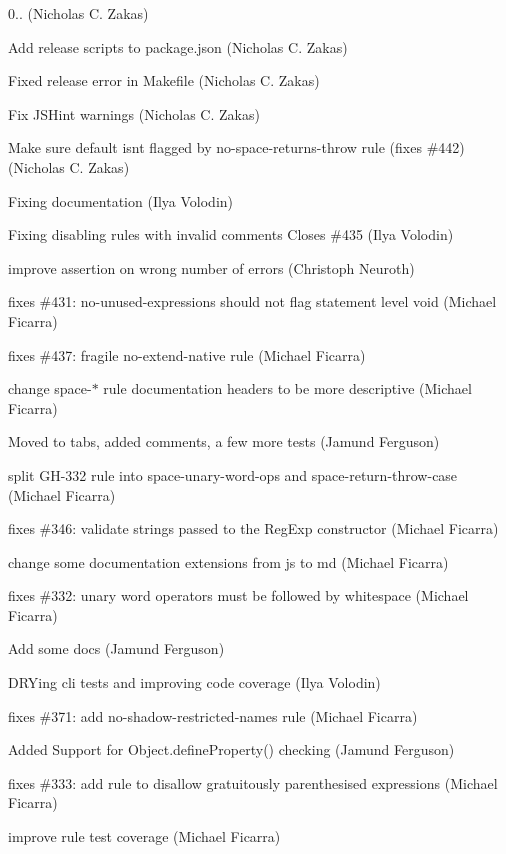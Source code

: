 \begin{DoxyItemize}
\item 0.. (Nicholas C. Zakas)
\item Add release scripts to package.\+json (Nicholas C. Zakas)
\item Fixed release error in Makefile (Nicholas C. Zakas)
\item Fix J\+S\+Hint warnings (Nicholas C. Zakas)
\item Make sure \textquotesingle{}default\textquotesingle{} isn\textquotesingle{}t flagged by no-\/space-\/returns-\/throw rule (fixes \#442) (Nicholas C. Zakas)
\item Fixing documentation (Ilya Volodin)
\item Fixing disabling rules with invalid comments Closes \#435 (Ilya Volodin)
\item improve assertion on wrong number of errors (Christoph Neuroth)
\item fixes \#431\+: no-\/unused-\/expressions should not flag statement level void (Michael Ficarra)
\item fixes \#437\+: fragile no-\/extend-\/native rule (Michael Ficarra)
\item change space-\/$\ast$ rule documentation headers to be more descriptive (Michael Ficarra)
\item Moved to tabs, added comments, a few more tests (Jamund Ferguson)
\item split G\+H-\/332 rule into space-\/unary-\/word-\/ops and space-\/return-\/throw-\/case (Michael Ficarra)
\item fixes \#346\+: validate strings passed to the Reg\+Exp constructor (Michael Ficarra)
\item change some documentation extensions from js to md (Michael Ficarra)
\item fixes \#332\+: unary word operators must be followed by whitespace (Michael Ficarra)
\item Add some docs (Jamund Ferguson)
\item D\+R\+Ying cli tests and improving code coverage (Ilya Volodin)
\item fixes \#371\+: add no-\/shadow-\/restricted-\/names rule (Michael Ficarra)
\item Added Support for Object.\+define\+Property() checking (Jamund Ferguson)
\item fixes \#333\+: add rule to disallow gratuitously parenthesised expressions (Michael Ficarra)
\item improve rule test coverage (Michael Ficarra)

\end{DoxyItemize}
